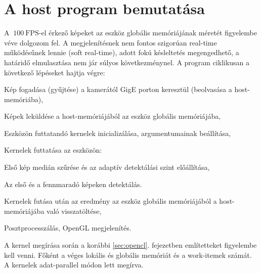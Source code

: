 \chapter{A host program bemutatása}
	A $~100\ \mathrm{FPS}$-el érkező képeket az eszköz globális memóriájának méretét figyelembe véve dolgozom fel.
	A megjelenítésnek nem fontos szigorúan real-time működésűnek lennie (soft real-time), adott fokú késleltetés megengedhető, a
	határidő elmulasztása nem jár súlyos következménynel. A program ciklikusan a következő lépéseket hajtja végre:
	\begin{enumerate*}
		\item Kép fogadása (gyűjtése) a kamerától GigE porton keresztül (beolvasása a host-memóriába),
		\item Képek leküldése a host-memóriájából az eszköz globális memóriájába,
		\item Eszközön futtatandó kernelek inicializálása, argumentumainak beállítása,
		\item Kernelek futtatása az eszközön:
		\begin{enumerate*}
			\item Első kép medián szűrése és az adaptív detektálási szint előállítása,
			\item Az első és a fennmaradó képeken detektálás.
		\end{enumerate*}
		\item Kernelek futása után az eredmény az eszköz globális memóriájából a host-memóriájába való
		visszatöltése,
		\item Posztprocesszálás, OpenGL megjelenítés.
	\end{enumerate*}
	A kernel megírása során a korábbi \ref{sec:opencl}. fejezetben említetteket figyelembe kell venni.
	Főként a véges lokális és globális memóriát és a work-itemek számát. A kernelek adat-parallel módon lett megírva.
	
